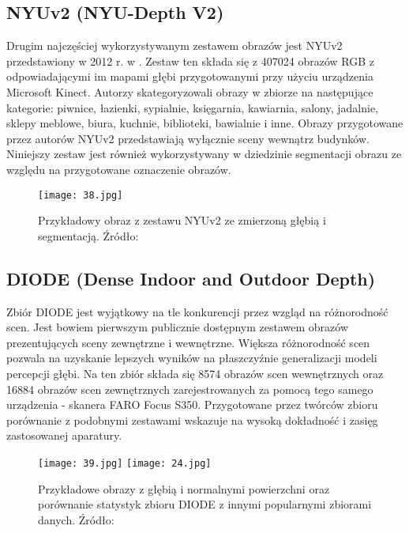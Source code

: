 \subsection{NYUv2 (NYU-Depth V2)}
Drugim najczęściej wykorzystywanym zestawem obrazów jest NYUv2 przedstawiony w 2012 r. w \cite{couprie2013}. Zestaw ten składa się z 407024 obrazów RGB z odpowiadającymi im mapami głębi przygotowanymi przy użyciu urządzenia Microsoft Kinect. Autorzy skategoryzowali obrazy w zbiorze na następujące kategorie: piwnice, łazienki, sypialnie, księgarnia, kawiarnia, salony, jadalnie, sklepy meblowe, biura, kuchnie, biblioteki, bawialnie i inne. Obrazy przygotowane przez autorów NYUv2 przedstawiają wyłącznie sceny wewnątrz budynków. Niniejszy zestaw jest również wykorzystywany w dziedzinie segmentacji obrazu ze względu na przygotowane oznaczenie obrazów.
\begin{figure}[H]
    \centering
    \texttt{[image: 38.jpg]}
    \caption{Przykładowy obraz z zestawu NYUv2 ze zmierzoną głębią i segmentacją. Źródło: \cite{couprie2013}}
    \label{fig:nyuv2-example}
\end{figure}
\subsection{DIODE (Dense Indoor and Outdoor Depth)}
Zbiór DIODE \cite{vasiljevic2019} jest wyjątkowy na tle konkurencji przez wzgląd na różnorodność scen. Jest bowiem pierwszym publicznie dostępnym zestawem obrazów prezentujących sceny zewnętrzne i wewnętrzne. Większa różnorodność scen pozwala na uzyskanie lepszych wyników na płaszczyźnie generalizacji modeli percepcji głębi. Na ten zbiór składa się 8574 obrazów scen wewnętrznych oraz 16884 obrazów scen zewnętrznych zarejestrowanych za pomocą tego samego urządzenia - skanera FARO Focus S350. Przygotowane przez twórców zbioru porównanie z podobnymi zestawami wskazuje na wysoką dokładność i zasięg zastosowanej aparatury.
\begin{figure}[H]
    \centering
    \texttt{[image: 39.jpg]}
    \texttt{[image: 24.jpg]}
    \caption{Przykładowe obrazy z głębią i normalnymi powierzchni oraz porównanie statystyk zbioru DIODE z innymi popularnymi zbiorami danych. Źródło: \cite{vasiljevic2019}}
    \label{fig:diode-comparison}
\end{figure}
